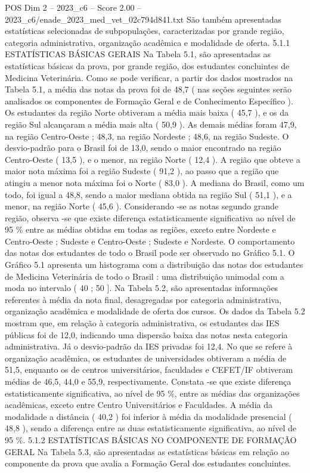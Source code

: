 \begin{textsample}{POS Dim 2 – 2023\_c6 – Score 2.00 – 2023\_c6/enade\_2023\_med\_vet\_02c794d841.txt}
São também apresentadas estatísticas selecionadas de subpopulações, caracterizadas por grande região, categoria administrativa, organização acadêmica e modalidade de oferta. 5.1.1 ESTATÍSTICAS BÁSICAS GERAIS Na Tabela 5.1, são apresentadas as estatísticas básicas da prova, por grande região, dos estudantes concluintes de Medicina Veterinária.
Como se pode verificar, a partir dos dados mostrados na Tabela 5.1, a média das notas da prova foi de 48,7 ( nas seções seguintes serão analisados os componentes de Formação Geral e de Conhecimento Específico ).
Os estudantes da região Norte obtiveram a média mais baixa ( 45,7 ), e os da região Sul alcançaram a média mais alta ( 50,9 ).
As demais médias foram 47,9, na região Centro-Oeste ; 48,3, na região Nordeste ; 48,6, na região Sudeste.
O desvio-padrão para o Brasil foi de 13,0, sendo o maior encontrado na região Centro-Oeste ( 13,5 ), e o menor, na região Norte ( 12,4 ).
A região que obteve a maior nota máxima foi a região Sudeste ( 91,2 ), ao passo que a região que atingiu a menor nota máxima foi o Norte ( 83,0 ).
A mediana do Brasil, como um todo, foi igual a 48,8, sendo a maior mediana obtida na região Sul ( 51,1 ), e a menor, na região Norte ( 45,6 ).
Considerando -se as notas segundo grande região, observa -se que existe diferença estatisticamente significativa ao nível de 95 \% entre as médias obtidas em todas as regiões, exceto entre Nordeste e Centro-Oeste ; Sudeste e Centro-Oeste ; Sudeste e Nordeste.
O comportamento das notas dos estudantes de todo o Brasil pode ser observado no Gráfico 5.1.
O Gráfico 5.1 apresenta um histograma com a distribuição das notas dos estudantes de Medicina Veterinária de todo o Brasil : uma distribuição unimodal com a moda no intervalo ( 40 ; 50 ].
Na Tabela 5.2, são apresentadas informações referentes à média da nota final, desagregadas por categoria administrativa, organização acadêmica e modalidade de oferta dos cursos.
Os dados da Tabela 5.2 mostram que, em relação à categoria administrativa, os estudantes das IES públicas foi de 12,0, indicando uma dispersão baixa das notas nesta categoria administrativa.
Já o desvio-padrão da IES privadas foi 12,4.
No que se refere à organização acadêmica, os estudantes de universidades obtiveram a média de 51,5, enquanto os de centros universitários, faculdades e CEFET/IF obtiveram médias de 46,5, 44,0 e 55,9, respectivamente.
Constata -se que existe diferença estatisticamente significativa, ao nível de 95 \%, entre as médias das organizações acadêmicas, exceto entre Centro Universitários e Faculdades.
A média da modalidade a distância ( 40,2 ) foi inferior à média da modalidade presencial ( 48,8 ), sendo a diferença entre as duas estatisticamente significativa, ao nível de 95 \%. 5.1.2 ESTATÍSTICAS BÁSICAS NO COMPONENTE DE FORMAÇÃO GERAL Na Tabela 5.3, são apresentadas as estatísticas básicas em relação ao componente da prova que avalia a Formação Geral dos estudantes concluintes.

\end{textsample}
